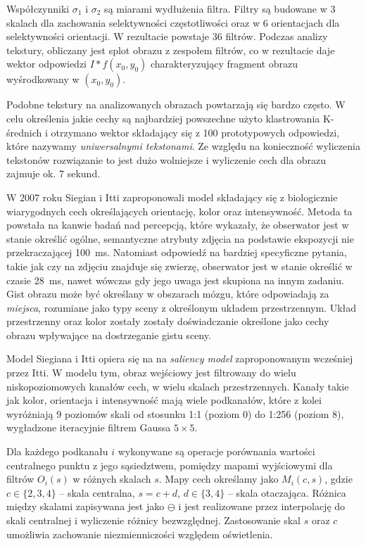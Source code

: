 Współczynniki $\sigma_1$ i $\sigma_2$ są miarami wydłużenia filtra. Filtry są budowane w 3 skalach dla zachowania selektywności częstotliwości oraz w 6 orientacjach dla selektywności orientacji. W rezultacie powstaje 36 filtrów. Podczas analizy tekstury, obliczany jest splot obrazu z zespołem filtrów, co w rezultacie daje wektor odpowiedzi $I \ast f(x_0, y_0)$ charakteryzujący fragment obrazu wyśrodkowany w $(x_0, y_0)$. 

Podobne tekstury na analizowanych obrazach powtarzają się bardzo często. W celu określenia jakie cechy są najbardziej powszechne użyto klastrowania K-średnich i otrzymano wektor składający się z 100 prototypowych odpowiedzi, które nazywamy \emph{uniwersalnymi tekstonami}. Ze względu na konieczność wyliczenia tekstonów rozwiązanie to jest dużo wolniejsze i wyliczenie cech dla obrazu zajmuje ok. 7 sekund.\cite{VISWANATHAN08}

W 2007 roku Siegian i Itti zaproponowali model składający się z biologicznie wiarygodnych cech określających orientację, kolor oraz intensywność.\cite{SIAGIAN07} Metoda ta powstała na kanwie badań nad percepcją, które wykazały, że obserwator jest w stanie określić ogólne, semantyczne atrybuty zdjęcia na podstawie ekspozycji nie przekraczającej 100~ms. Natomiast odpowiedź na bardziej specyficzne pytania, takie jak czy na zdjęciu znajduje się zwierzę, obserwator jest w stanie określić w czasie 28~ms\cite{THORPE95}, nawet wówczas gdy jego uwaga jest skupiona na innym zadaniu. Gist obrazu może być określany w obszarach mózgu, które odpowiadają za \emph{miejsca}, rozumiane jako typy sceny z określonym układem przestrzennym.\cite{EPSTEIN00} Układ przestrzenny oraz kolor zostały zostały doświadczanie określone jako cechy obrazu wpływające na dostrzeganie gistu sceny.\cite{OLIVA-SCHYNS00}

Model Siegiana i Itti opiera się na na \emph{saliency model} zaproponowanym wcześniej przez Itti. W modelu tym, obraz wejściowy jest filtrowany do wielu niskopoziomowych kanałów cech, w wielu skalach przestrzennych. Kanały takie jak kolor, orientacja i intensywność mają wiele podkanałów, które z kolei wyróżniają 9 poziomów skali od stosunku 1:1 (poziom 0) do 1:256 (poziom 8), wygładzone iteracyjnie filtrem Gaussa $5 \times 5$.

Dla każdego podkanału $i$ wykonywane są operacje porównania wartości centralnego punktu z jego sąsiedztwem, pomiędzy mapami wyjściowymi dla filtrów $O_i(s)$ w różnych skalach $s$. Mapy cech określamy jako $M_i(c, s)$, gdzie $c \in \{2, 3, 4\}$ -- skala centralna, $s = c + d$, $d \in \{3, 4\}$ -- skala otaczająca. Różnica między skalami zapisywana jest jako $\ominus$ i jest realizowane przez interpolację do skali centralnej i wyliczenie różnicy bezwzględnej. Zastosowanie skal $s$ oraz $c$ umożliwia zachowanie niezmienniczości względem oświetlenia.

